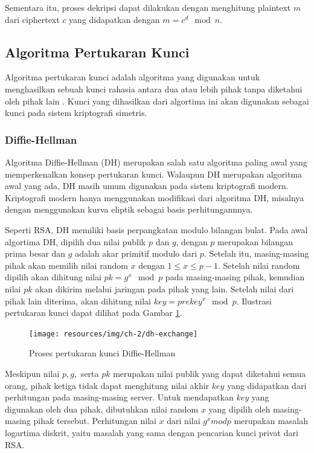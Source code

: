     Sementara itu, proses dekripsi dapat dilakukan dengan menghitung plaintext $m$ dari ciphertext $c$ yang didapatkan dengan $m = c^d \mod n$.


  \subsection{Algoritma Pertukaran Kunci}
  Algoritma pertukaran kunci adalah algoritma yang digunakan untuk menghasilkan sebuah kunci rahasia antara dua atau lebih pihak tanpa diketahui oleh pihak lain \citep{applied_crypto}. Kunci yang dihasilkan dari algortima ini akan digunakan sebagai kunci pada sistem kriptografi simetris.

    \subsubsection{Diffie-Hellman}
    Algoritma Diffie-Hellman (DH) merupakan salah satu algoritma paling awal yang memperkenalkan konsep pertukaran kunci. Walaupun DH merupakan algoritma awal yang ada, DH masih umum digunakan pada sistem kriptografi modern. Kriptografi modern hanya menggunakan modifikasi dari algoritma DH, misalnya dengan menggunakan kurva eliptik sebagai basis perhitungannnya.

    Seperti RSA, DH memiliki basis perpangkatan modulo bilangan bulat. Pada awal algortima DH, dipilih dua nilai publik $p$ dan $g$, dengan $p$ merupakan bilangan prima besar dan $g$ adalah akar primitif modulo dari $p$. Setelah itu, masing-masing pihak akan memilih nilai random $x$ dengan $1 \leq x \leq p-1 $. Setelah nilai random dipilih akan dihitung nilai $pk = g^x \mod p$ pada masing-masing pihak, kemudian nilai $pk$ akan dikirim melalui jaringan pada pihak yang lain. Setelah nilai dari pihak lain diterima, akan dihitung nilai $key = prekey^x \mod p$. Ilustrasi pertukaran kunci dapat dilihat pada Gambar \ref{fig:dh_exchange}.

    \begin{figure}[h]
      \centering
      \texttt{[image: resources/img/ch-2/dh-exchange]}
      \caption{Proses pertukaran kunci Diffie-Hellman}
      \label{fig:dh_exchange}
    \end{figure}

    Meskipun nilai $p, g, $ serta $pk$ merupakan nilai publik yang dapat diketahui semua orang, pihak ketiga tidak dapat menghitung nilai akhir $key$ yang didapatkan dari perhitungan pada masing-masing server. Untuk mendapatkan $key$ yang digunakan oleh dua pihak, dibutuhkan nilai random $x$ yang dipilih oleh masing-masing pihak tersebut. Perhitungan nilai $x$ dari nilai $g^x mod p$ merupakan masalah logartima diskrit, yaitu masalah yang sama dengan pencarian kunci privat dari RSA.

